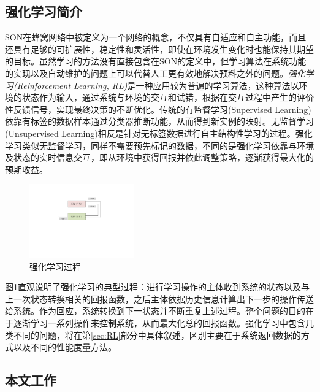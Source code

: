 \documentclass{IEEEtran}
\begin{document}
\subsection{强化学习简介}


SON在蜂窝网络中被定义为一个网络的概念，不仅具有自适应和自主功能，而且还具有足够的可扩展性，稳定性和灵活性，即使在环境发生变化时也能保持其期望的目标。虽然学习的方法没有直接包含在SON的定义中，但学习算法在系统功能的实现以及自动维护的问题上可以代替人工更有效地解决预料之外的问题。\emph{强化学习(Reinforcement Learning, RL)}是一种应用较为普遍的学习算法，这种算法以环境的状态作为输入，通过系统与环境的交互和试错，根据在交互过程中产生的评价性反馈信号，实现最终决策的不断优化。传统的有监督学习(Supervised Learning)依靠有标签的数据样本通过分类器推断功能，从而得到新实例的映射。无监督学习(Unsupervised Learning)相反是针对无标签数据进行自主结构性学习的过程。强化学习类似无监督学习，同样不需要预先标记的数据，不同的是强化学习依靠与环境及状态的实时信息交互，即从环境中获得回报并依此调整策略，逐渐获得最大化的预期收益。
\begin{figure}%
\centerline{\includegraphics[width=0.4\textwidth]{reinforcement.pdf}}
\caption{强化学习过程}
\label{fig:rein}
\end{figure}

图\ref{fig:rein}直观说明了强化学习的典型过程：进行学习操作的主体收到系统的状态以及与上一次状态转换相关的回报函数，之后主体依据历史信息计算出下一步的操作传送给系统。作为回应，系统转换到下一状态并不断重复上述过程。整个问题的目的在于逐渐学习一系列操作来控制系统，从而最大化总的回报函数。强化学习中包含几类不同的问题，将在第\ref{sec:RL}部分中具体叙述，区别主要在于系统返回数据的方式以及不同的性能度量方法。


\subsection{本文工作}
\end{document}
